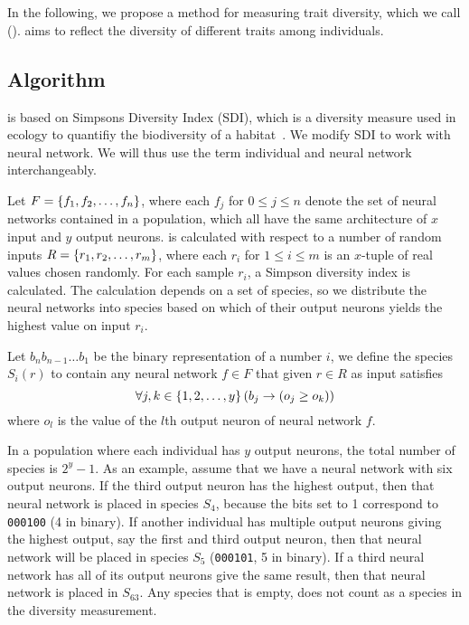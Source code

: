 \section{\di{}}
In the following, we propose a method for measuring trait diversity, which we call \emph{\di{}} (\dia). \dia{} aims to reflect the diversity of different traits among individuals. 

\subsection{Algorithm}
\dia{} is based on Simpsons Diversity Index (SDI), which is a diversity measure used in ecology to quantifiy the biodiversity of a habitat~\cite{simpson1949measurement}. We modify SDI to work with neural network. We will thus use the term individual and neural network interchangeably.

Let $F = \left\{ f_1, f_2, \dots, f_n \right\}$, where each $f_j$ for $0 \leq j \leq n$ denote the set of neural networks contained in a population, which all have the same architecture of $x$ input and $y$ output neurons. \dia{} is calculated with respect to a number of random inputs $R = \left\{ r_1, r_2, \dots, r_m \right\}$, where each $r_i$ for $1 \leq i \leq m$ is an $x$-tuple of real values chosen randomly. For each sample $r_i$, a Simpson diversity index is calculated. The calculation depends on a set of species, so we distribute the neural networks into species based on which of their output neurons yields the highest value on input $r_i$. 

Let $b_{n}b_{n-1}\dots b_1$ be the binary representation of a number $i$,
we define the species $S_i(r)$ to contain any neural network $f \in F$ that given $r \in R$ as input satisfies
%
\[
  \forall j,k \in \left\{ 1,2,\dots,y \right\} \left(b_j \rightarrow \left(o_j \geq o_k\right)\right)
\]
%
where $o_l$ is the value of the $l$th output neuron of neural network $f$.

In a population where each individual has $y$ output neurons, the total number of species is $2^y - 1$.  As an example, assume that we have a neural network with six output neurons. If the third output neuron has the highest output, then that neural network is placed in species $S_4$, because the bits set to 1 correspond to \texttt{000100} (4 in binary). If another individual has multiple output neurons giving the highest output, say the first and third output neuron, then that neural network will be placed in species $S_5$ (\texttt{000101}, 5 in binary). If a third neural network has all of its output neurons give the same result, then that neural network is placed in $S_{63}$. Any species that is empty, does not count as a species in the diversity measurement.

